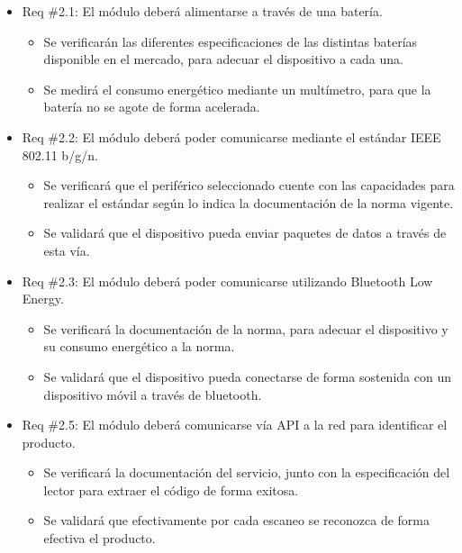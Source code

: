 \documentclass[
11pt, %
codirector, %
]{charter}
\begin{document}
\begin{itemize} 
\item Req \#2.1: El módulo deberá alimentarse a través de una batería.

\begin{itemize}
	\item Se verificarán las diferentes especificaciones de las distintas baterías disponible en el mercado, para adecuar el dispositivo a cada una.
	\item Se medirá el consumo energético mediante un multímetro, para que la batería no se agote de forma acelerada.   
\end{itemize}


\item Req \#2.2: El módulo deberá poder comunicarse mediante el estándar IEEE 802.11 b/g/n.

\begin{itemize}
	\item Se verificará que el periférico seleccionado cuente con las capacidades para realizar el estándar según lo indica la documentación de la norma vigente.
	\item Se validará que el dispositivo pueda enviar paquetes de datos a través de esta vía.  
\end{itemize}

\item Req \#2.3: El módulo deberá poder comunicarse utilizando Bluetooth Low Energy.

\begin{itemize}
	\item Se verificará la documentación de la norma, para adecuar el dispositivo y su consumo energético a la norma.
	\item Se validará que el dispositivo pueda conectarse de forma sostenida con un dispositivo móvil a través de bluetooth. 
\end{itemize}


\item Req \#2.5: El módulo deberá comunicarse vía API a la red para identificar el producto.

\begin{itemize}
	\item Se verificará la documentación del servicio, junto con la especificación del lector para extraer el código de forma exitosa.
	\item Se validará que efectivamente por cada escaneo se reconozca de forma efectiva el producto. 
\end{itemize}



\end{itemize}
\end{document}
